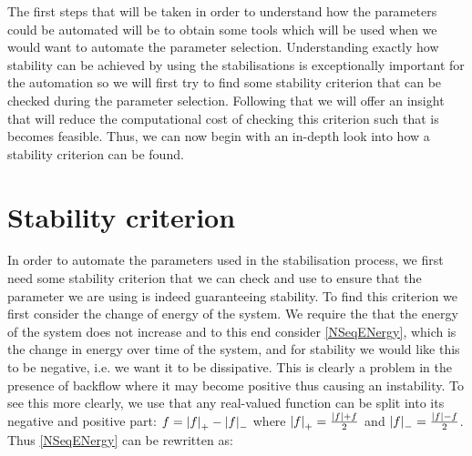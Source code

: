 
The first steps that will be taken in order to understand how the parameters could be automated will be to obtain some tools which will be used when we would want to automate the parameter selection. Understanding exactly how stability can be achieved by using the stabilisations is exceptionally important for the automation so we will first try to find some stability criterion that can be checked during the parameter selection. Following that we will offer an insight that will reduce the computational cost of checking this criterion such that is becomes feasible. Thus, we can now begin with an in-depth look into how a stability criterion can be found.

\section{Stability criterion}
In order to automate the parameters used in the stabilisation process, we first need some stability criterion that we can check and use to ensure that the parameter we are using is indeed guaranteeing stability. To find this criterion we first consider the change of energy of the system. We require the that the energy of the system does not increase and to this end consider \autoref{NSeqENergy}, which is the change in energy over time of the system, and for stability we would like this to be negative, i.e. we want it to be dissipative. This is clearly a problem in the presence of backflow where it may become positive thus causing an instability. To see this more clearly, we use that any real-valued function can be split into its negative and positive part: \( f = \abs{f}_+ - \abs{f}_-\) where \( \abs{f}_+ = \frac{\abs{f} + f}{2}\) and \( \abs{f}_- = \frac{\abs{f} - f}{2}\). Thus \autoref{NSeqENergy} can be rewritten as:

